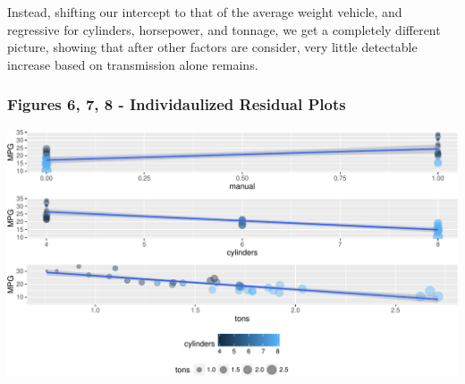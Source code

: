\documentclass[]{article}
\begin{document}
Instead, shifting our intercept to that of the average weight vehicle,
and regressive for cylinders, horsepower, and tonnage, we get a
completely different picture, showing that after other factors are
consider, very little detectable increase based on transmission alone
remains.

\subsubsection{Figures 6, 7, 8 - Individaulized Residual
Plots}\label{figures-6-7-8---individaulized-residual-plots}

\includegraphics{study_files/figure-latex/plot the residuals of transmission-1.pdf}
\end{document}
